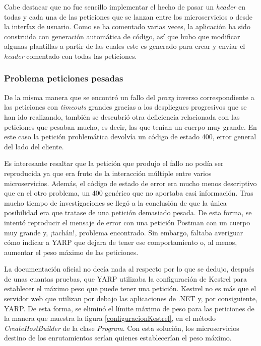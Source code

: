 \documentclass[11pt,spanish,listoffigures]{tfgetsinf}
\begin{document}
Cabe destacar que no fue sencillo implementar el hecho de pasar un \emph{header} en todas y cada una de las peticiones que se lanzan entre los microservicios o desde la interfaz de usuario. Como se ha comentado varias veces, la aplicación ha sido construida con generación automática de código, así que hubo que modificar algunas plantillas a partir de las cuales este es generado para crear y enviar el \emph{header} comentado con todas las peticiones.


			\subsubsection{Problema peticiones pesadas}

De la misma manera que se encontró un fallo del \emph{proxy} inverso correspondiente a las peticiones con \emph{timeouts} grandes gracias a los despliegues progresivos que se han ido realizando, también se descubrió otra deficiencia relacionada con las peticiones que pesaban mucho, es decir, las que tenían un cuerpo muy grande. En este caso la petición problemática devolvía un código de estado 400, error general del lado del cliente.

Es interesante resaltar que la petición que produjo el fallo no podía ser reproducida ya que era fruto de la interacción múltiple entre varios microservicios. Además, el código de estado de error era mucho menos descriptivo que en el otro problema, un 400 genérico que no aportaba casi información. Tras mucho tiempo de investigaciones se llegó a la conclusión de que la única posibilidad era que tratase de una petición demasiado pesada. De esta forma, se intentó reproducir el mensaje de error con una petición Postman con un cuerpo muy grande y, ¡tachán!, problema encontrado. Sin embargo, faltaba averiguar cómo indicar a YARP que dejara de tener ese comportamiento o, al menos, aumentar el peso máximo de las peticiones.

La documentación oficial no decía nada al respecto por lo que se dedujo, después de unas cuantas pruebas, que YARP utilizaba la configuración de Kestrel \cite{Kestrel} para establecer el máximo peso que puede tener una petición. Kestrel no es más que el servidor web que utilizan por debajo las aplicaciones de .NET y, por consiguiente, YARP. De esta forma, se eliminó el límite máximo de peso para las peticiones de la manera que muestra la figura \ref{configuracionKestrel}, en el método \emph{CreateHostBuilder} de la clase \emph{Program}. Con esta solución, los microservicios destino de los enrutamientos serían quienes establecerían el peso máximo.
\end{document}
